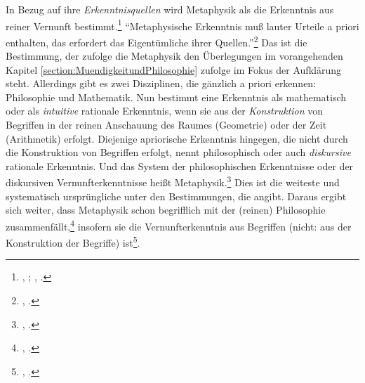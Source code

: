 \begin{nummerierung}
\item\label{MethodikundQuellenderMetaphysik} In Bezug
auf ihre \emph{Erkenntnisquellen} wird Metaphysik als die Erkenntnis aus reiner
Vernunft
bestimmt.\footnote{\cite[Vgl.][\S~1]{Kant:ProlegomenazueinerjedenkuenftigenMetaphysikdiealsWissenschaftwirdauftretenkoennen1977},
\cite[][IV: 265.5--266.8]{Kant:GesammelteWerke1900ff.};
\cite[][B 869]{Kant:KritikderreinenVernunft2003},
\cite[][III: 543.27--544.2]{Kant:GesammelteWerke1900ff.}.}
\enquote{Metaphysische Erkenntnis muß lauter Urteile a priori enthalten, das erfordert das Eigentümliche ihrer Quellen.}\footnote{\cite[][\S~2]{Kant:ProlegomenazueinerjedenkuenftigenMetaphysikdiealsWissenschaftwirdauftretenkoennen1977}, \cite[][IV: 266.15--16]{Kant:GesammelteWerke1900ff.}.} Das ist die Bestimmung, der zufolge die Metaphysik den Überlegungen im vorangehenden Kapitel \ref{section:MuendigkeitundPhilosophie} zufolge im Fokus der Aufklärung steht.
Allerdings gibt es zwei Disziplinen, die gänzlich a priori erkennen: Philosophie und Mathematik.
Nun bestimmt  eine Erkenntnis als mathematisch oder als
\emph{intuitive} rationale Erkenntnis, wenn sie aus der \emph{Konstruktion} von
Begriffen in der reinen Anschauung des Raumes (Geometrie) oder der Zeit
(Arithmetik) erfolgt. Diejenige apriorische Erkenntnis hingegen, die nicht durch
die Konstruktion von Begriffen erfolgt, nennt 
philosophisch oder auch \emph{diskursive} rationale Erkenntnis. Und das System
der philosophischen Erkenntnisse oder der diskursiven Vernunfterkenntnisse heißt
Metaphysik.\footnote{\cite[Vgl.][B 869]{Kant:KritikderreinenVernunft2003}, \cite[][III: 543.27--544.2]{Kant:GesammelteWerke1900ff.}.} Dies ist die weiteste
und systematisch ursprüngliche unter den Bestimmungen, die 
angibt. Daraus ergibt sich weiter, dass Metaphysik
schon begrifflich mit der (reinen) Philosophie
zusammenfällt,\footnote{\cite[Vgl.][B~869,
878]{Kant:KritikderreinenVernunft2003}, \cite[][III: 544.2--8,
549.13--16]{Kant:GesammelteWerke1900ff.}.} insofern sie die
Ver\-nunft\-er\-kennt\-nis aus Begriffen (nicht: aus der Konstruktion der
Begriffe) ist\footnote{\cite[Vgl.][B 865]{Kant:KritikderreinenVernunft2003}, \cite[][III:
541.18--20, 542.3]{Kant:GesammelteWerke1900ff.}.}.


\end{nummerierung}
